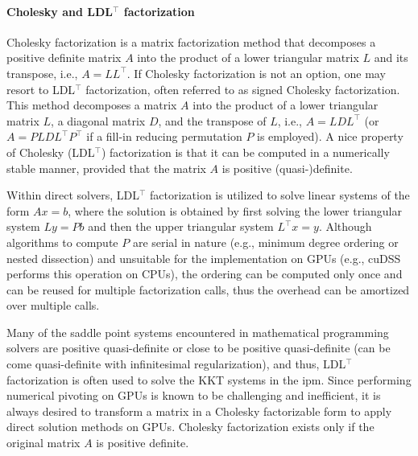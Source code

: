 \documentclass{article}
\begin{document}
\paragraph{Cholesky and LDL$^\top$ factorization}
Cholesky factorization is a matrix factorization method that decomposes a positive definite matrix $A$ into the product of a lower triangular matrix $L$ and its transpose, i.e., $A = LL^\top$. 
If Cholesky factorization is not an option, one may resort to LDL$^\top$ factorization, often referred to as signed Cholesky factorization.
This method decomposes a matrix $A$ into the product of a lower triangular matrix $L$, a diagonal matrix $D$, and the transpose of $L$, i.e., $A = L D L^\top$ (or $A = P L D L^\top P^\top$ if a fill-in reducing  permutation $P$ is employed).
A nice property of Cholesky (LDL$^\top$) factorization is that it can be computed in a numerically stable manner, provided that the matrix $A$ is positive (quasi-)definite.

Within direct solvers, LDL$^\top$ factorization is utilized to solve linear systems of the form $Ax = b$, where the solution is obtained by first solving the lower triangular system $Ly = Pb$ and then the upper triangular system $L^\top x = y$.
Although algorithms to compute $P$ are serial in nature (e.g., minimum degree ordering or nested dissection) and unsuitable for the implementation on GPUs (e.g., cuDSS performs this operation on CPUs), the ordering can be computed only once and can be reused for multiple factorization calls, thus the overhead can be amortized over multiple calls.

Many of the saddle point systems encountered in mathematical programming solvers are positive quasi-definite or close to be positive quasi-definite (can be come quasi-definite with infinitesimal regularization), and thus, LDL$^\top$ factorization is often used to solve the KKT systems in the \gls*{ipm}.
Since performing numerical pivoting on GPUs is known to be challenging and inefficient, it is always desired to transform a matrix in a Cholesky factorizable form to apply direct solution methods on GPUs.
Cholesky factorization exists only if the original matrix $A$ is positive definite.

\end{document}
